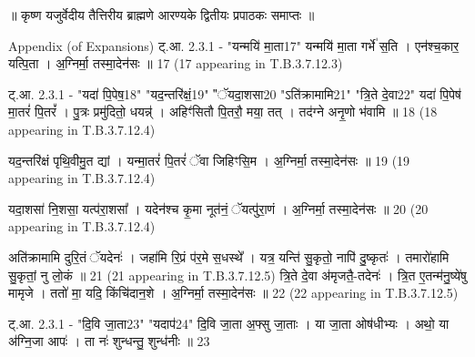 \documentclass[17pt]{extarticle}
\begin{document}
॥ कृष्ण यजुर्वेदीय तैत्तिरीय ब्राह्मणे आरण्यके द्वितीयः प्रपाठकः समाप्तः ॥

Appendix (of Expansions)
ट्.आ. 2.3.1 - "यन्मयि॑ मा॒ता{17}" 
यन्मयि॑ मा॒ता गर्भे॑ स॒ति । एन॑श्च॒कार॒ यत्पि॒ता । 
अ॒ग्निर्मा॒ तस्मा॒देन॑सः ॥ {17} 
({17} appearing in T.B.3.7.12.3) 

ट्.आ. 2.3.1 - "यदा॑ पि॒पेष॒{18}" "यद॒न्तरि॑क्षं॒{19}" 
"ॅयदा॒शसा{20} "ऽति॑क्रामामि{21}" "त्रि॒ते दे॒वा{22}" 
यदा॑ पि॒पेष॑ मा॒तरं॑ पि॒तरं᳚ । पु॒त्रः प्रमु॑दितो॒ धयन्न्॑ । अहिꣳ॑सितौ पि॒तरौ॒ मया॒ तत् । तद॑ग्ने अनृ॒णो भ॑वामि ॥ {18}
({18} appearing in T.B.3.7.12.4)

यद॒न्तरि॑क्षं पृथि॒वीमु॒त द्यां । यन्मा॒तरं॑ पि॒तरं॑ ॅवा जिहिꣳसि॒म । 
अ॒ग्निर्मा॒ तस्मा॒देन॑सः ॥ {19}
({19} appearing in T.B.3.7.12.4)

यदा॒शसा॑ नि॒शसा॒ यत्प॑रा॒शसा᳚ । यदेन॑श्च कृ॒मा नूत॑नं॒ ॅयत्पु॑रा॒णं । 
अ॒ग्निर्मा॒ तस्मा॒देन॑सः ॥ {20} 
({20} appearing in T.B.3.7.12.4)


अति॑क्रामामि दुरि॒तं ॅयदेनः॑ । जहा॑मि रि॒प्रं प॑र॒मे स॒धस्थे᳚ । 
यत्र॒ यन्ति॑ सु॒कृतो॒ नापि॑ दु॒ष्कृतः॑ । तमारो॑हामि सु॒कृतां॒ नु लो॒कं ॥ {21} 
({21} appearing in T.B.3.7.12.5)
त्रि॒ते दे॒वा अ॑मृजतै॒-तदेनः॑ । त्रि॒त ए॒तन्म॑नु॒ष्ये॑षु मामृजे । 
ततो॑ मा॒ यदि॒ किंचि॑दान॒शे । 
अ॒ग्निर्मा॒ तस्मा॒देन॑सः ॥ {22}
({22} appearing in T.B.3.7.12.5)

ट्.आ. 2.3.1 - "दि॒वि जा॒ता{23}" "यदाप॑{24}" 
दि॒वि जा॒ता अ॒फ्सु जा॒ताः । या जा॒ता ओष॑धीभ्यः । 
अथो॒ या अ॑ग्नि॒जा आपः॑ । ता नः॑ शुन्धन्तु॒ शुन्ध॑नीः ॥ {23}
\end{document}

